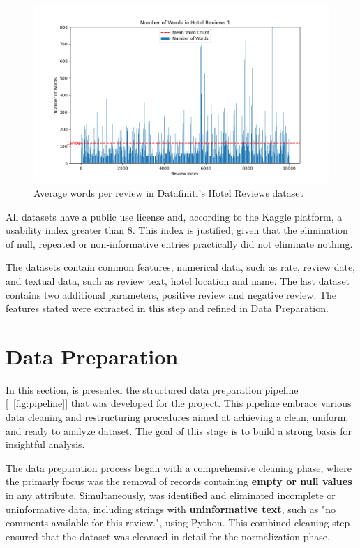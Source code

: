 \documentclass[sigconf]{acmart}
\begin{document}
\begin{figure}[H]
  \centering
  \includegraphics[width=\linewidth]{imgs/word_count_1.png}
  \caption{Average words per review in Datafiniti's Hotel Reviews dataset}
  \label{fig:reviewWords1}
\end{figure}

All datasets have a public use license and, according to the Kaggle platform, a usability index greater than 8. This index is justified, given that the elimination of null, repeated or non-informative entries practically did not eliminate nothing.

The datasets contain common features, numerical data, such as rate, review date, and textual data, such as review text, hotel location and name. The last dataset contains two additional parameters, positive review and negative review. The features stated were extracted in this step and refined in Data Preparation.


\section{Data Preparation}

In this section, is presented the structured data preparation pipeline [~\ref{fig:pipeline}] that was developed for the project. This pipeline embrace various data cleaning and restructuring procedures aimed at achieving a clean, uniform, and ready to analyze dataset. The goal of this stage is to build a strong basis for insightful analysis.

The data preparation process began with a comprehensive cleaning phase, where the primarly focus was the removal of records containing \textbf{empty or null values} in any attribute. Simultaneously, was identified and eliminated incomplete or uninformative data, including strings with \textbf{uninformative text}, such as "no comments available for this review.", using Python. This combined cleaning step ensured that the dataset was cleansed in detail for the normalization phase.
\end{document}
